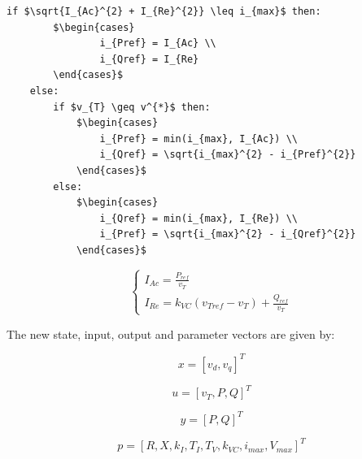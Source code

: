 \begin{center}
	\begin{lstlisting}[mathescape, columns=fullflexible]
	if $\sqrt{I_{Ac}^{2} + I_{Re}^{2}} \leq i_{max}$ then:
		$\begin{cases}
				i_{Pref} = I_{Ac} \\
				i_{Qref} = I_{Re}
		\end{cases}$
	else:
		if $v_{T} \geq v^{*}$ then:	
			$\begin{cases}
				i_{Pref} = min(i_{max}, I_{Ac}) \\
				i_{Qref} = \sqrt{i_{max}^{2} - i_{Pref}^{2}}
			\end{cases}$
		else:
			$\begin{cases}
				i_{Qref} = min(i_{max}, I_{Re}) \\
				i_{Pref} = \sqrt{i_{max}^{2} - i_{Qref}^{2}}
			\end{cases}$
	\end{lstlisting}
\end{center}

\begin{equation*}
	\begin{cases}
		I_{Ac} = \frac{P_{ref}}{v_{T}} \\
		I_{Re} = k_{VC}(v_{Tref} - v_{T}) + \frac{Q_{ref}}{v_{T}}
	\end{cases}
\end{equation*}

The new state, input, output and parameter vectors are given by:

\begin{equation}
	x = [v_{d}, v_{q}]^T
	\label{eq: x_proposed}
\end{equation}

\begin{equation}
	u = [v_{T}, P, Q]^T
	\label{eq: u_proposed}
\end{equation}

\begin{equation}
	y = [P, Q]^T
	\label{eq: y_proposed}
\end{equation}

\begin{equation}
	p = [R, X, k_{I}, T_{I}, T_{V}, k_{VC}, i_{max}, V_{max}]^T
	\label{eq: p_proposed}
\end{equation}